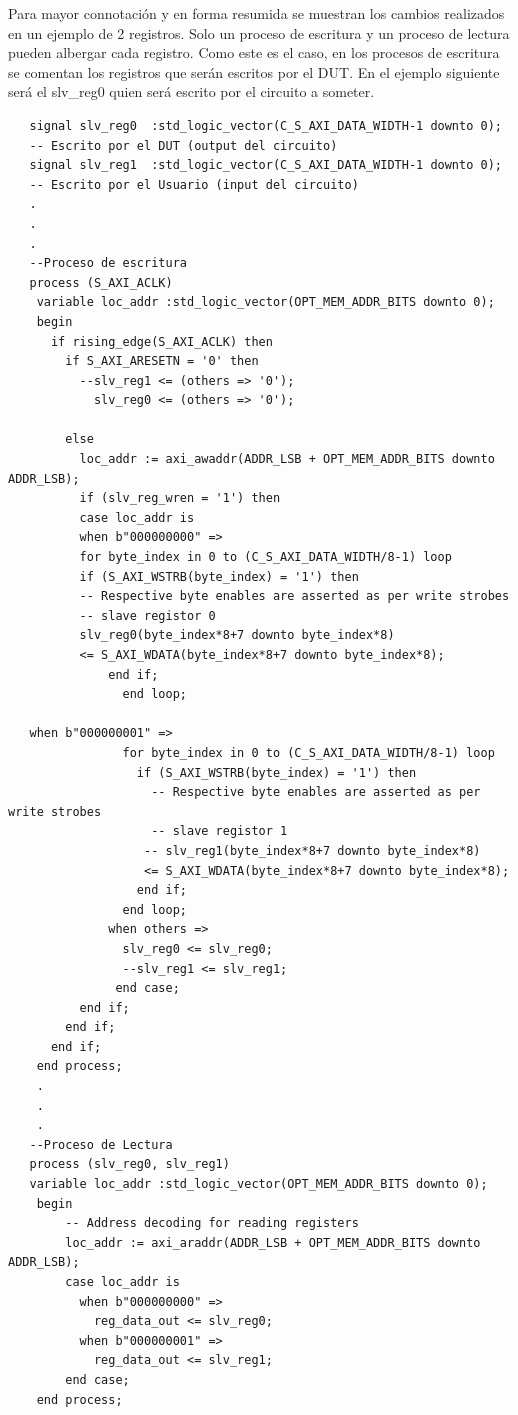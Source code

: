 \documentclass[a4paper,openright,12pt]{report}
\begin{document}
 Para mayor connotación y en forma resumida se muestran los cambios realizados en un ejemplo de 2 registros. Solo un proceso de escritura y un proceso de lectura pueden albergar cada registro. Como este es el caso, en los procesos de escritura se comentan los registros que serán escritos por el DUT. En el ejemplo siguiente será el slv\_reg0 quien será escrito por el circuito a someter.
 
   
   
   
   \begin{lstlisting}
   signal slv_reg0	:std_logic_vector(C_S_AXI_DATA_WIDTH-1 downto 0);
   -- Escrito por el DUT (output del circuito)
   signal slv_reg1	:std_logic_vector(C_S_AXI_DATA_WIDTH-1 downto 0);
   -- Escrito por el Usuario (input del circuito)
   .
   .
   .
   --Proceso de escritura
   process (S_AXI_ACLK)
	variable loc_addr :std_logic_vector(OPT_MEM_ADDR_BITS downto 0); 
	begin
	  if rising_edge(S_AXI_ACLK) then 
	    if S_AXI_ARESETN = '0' then
	      --slv_reg1 <= (others => '0');
            slv_reg0 <= (others => '0');
        
        else
	      loc_addr := axi_awaddr(ADDR_LSB + OPT_MEM_ADDR_BITS downto ADDR_LSB);
	      if (slv_reg_wren = '1') then
	      case loc_addr is
	      when b"000000000" =>
	      for byte_index in 0 to (C_S_AXI_DATA_WIDTH/8-1) loop
	      if (S_AXI_WSTRB(byte_index) = '1') then
	      -- Respective byte enables are asserted as per write strobes                   
	      -- slave registor 0
	      slv_reg0(byte_index*8+7 downto byte_index*8)
          <= S_AXI_WDATA(byte_index*8+7 downto byte_index*8);
	          end if;
	            end loop;
   
   when b"000000001" =>
	            for byte_index in 0 to (C_S_AXI_DATA_WIDTH/8-1) loop
	              if (S_AXI_WSTRB(byte_index) = '1') then
	                -- Respective byte enables are asserted as per write strobes                   
	                -- slave registor 1
	               -- slv_reg1(byte_index*8+7 downto byte_index*8)
                   <= S_AXI_WDATA(byte_index*8+7 downto byte_index*8);
	              end if;
	            end loop;
	          when others =>
	            slv_reg0 <= slv_reg0;
	            --slv_reg1 <= slv_reg1;
               end case;
	      end if;
	    end if;
	  end if;                   
	end process;
    .
    .
    .
   --Proceso de Lectura
   process (slv_reg0, slv_reg1)
   variable loc_addr :std_logic_vector(OPT_MEM_ADDR_BITS downto 0);
	begin
	    -- Address decoding for reading registers
	    loc_addr := axi_araddr(ADDR_LSB + OPT_MEM_ADDR_BITS downto ADDR_LSB);
	    case loc_addr is
	      when b"000000000" =>
	        reg_data_out <= slv_reg0;
	      when b"000000001" =>
	        reg_data_out <= slv_reg1;
	    end case;
	end process; 
   
   \end{lstlisting}
    
\end{document}
